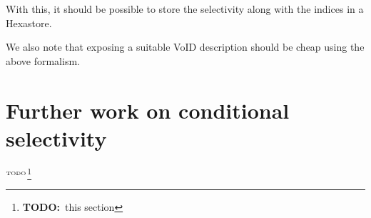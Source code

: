 \documentclass[12pt, draft]{article}
\newcommand{\todo}[1]{\ensuremath{^{\textrm{\tiny{TODO}\normalsize}}}\footnote{\textbf{TODO:}~#1}}
\begin{document}
With this, it should be possible to store the selectivity along with
the indices in a Hexastore.

We also note that exposing a suitable VoID description should be cheap
using the above formalism.

\section{Further work on conditional selectivity}

\todo{this section}



\end{document}
